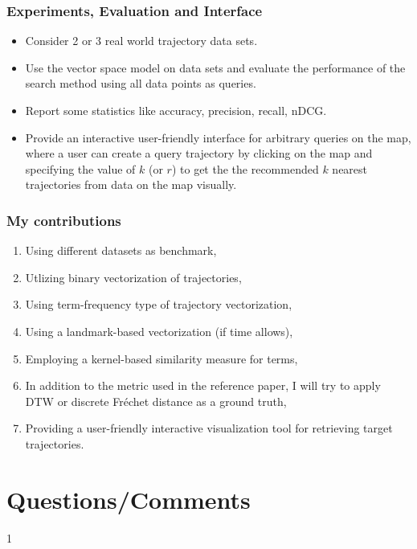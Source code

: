 \documentclass{beamer}
\begin{document}
\begin{frame}
\frametitle{Experiments, Evaluation and Interface} \pause
\begin{block}{}
\begin{itemize} 
\item Consider 2 or 3 real world trajectory data sets. \pause
\item Use the vector space model on data sets and evaluate the performance of the search method using all data points as queries. \pause
\item Report some statistics like {\color{blue} accuracy, precision, recall, nDCG}. \pause
\item Provide an interactive {\color{blue} user-friendly interface} for arbitrary queries on the map, where a user can create a query trajectory by clicking on the map and specifying the value of $k$ (or $r$) to get the the recommended $k$ nearest trajectories from data on the map visually.  
\end{itemize}
\end{block}
\end{frame}



\begin{frame}
\frametitle{My contributions} \pause
\begin{block}{}
\begin{enumerate} 
\item Using different datasets as benchmark, \pause
\item Utlizing binary vectorization of trajectories, \pause
\item Using term-frequency type of trajectory vectorization, \pause
\item Using a landmark-based vectorization (if time allows), \pause
\item Employing a kernel-based similarity measure for terms, \pause
\item In addition to the metric used in the reference paper, I will try to apply DTW or discrete Fr\'echet distance as a ground truth, \pause
\item Providing a user-friendly interactive visualization tool for retrieving target trajectories. 
\end{enumerate}

\end{block}
\end{frame}




\section*{Questions/Comments}
{\color{white}1}
\begin{center} 
{\huge {}}
\end{center}
\end{document}

